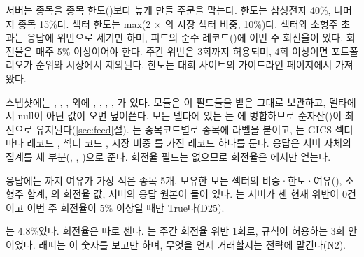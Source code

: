 \seclabel
{}

 서버는 종목을 종목 한도()보다 높게 만들 주문을 막는다. 한도는 삼성전자 40\%, 나머지 종목 15\%다. 섹터 한도는 max(2 $\times$ 의 시장 섹터 비중, 10\%)다. 섹터와 소형주 초과는  응답에 위반으로 세기만 하며, 피드의 준수 레코드()에 이번 주 회전율이 있다. 회전율은 매주 5\% 이상이어야 한다. 주간 위반은 3회까지 허용되며, 4회 이상이면 포트폴리오가 순위와 시상에서 제외된다. 한도는 대회 사이트의 가이드라인 페이지에서 가져왔다.

 스냅샷에는 , , ,  외에 , , , , 가 있다.  모듈은 이 필드들을 받은 그대로 보관하고, 델타에서 null이 아닌 값이 오면 덮어쓴다. 모든 델타에 있는 는 에 병합하므로 순자산()이 최신으로 유지된다(\ref{sec:feed}절). 는 종목코드별로 종목에 라벨을 붙이고, 는 GICS 섹터마다 레코드 , 섹터 코드 , 시장 비중 를 가진 레코드 하나를 둔다.  응답은 서버 자체의 집계를 세 부분(, , )으로 준다. 회전율 필드는 없으므로 회전율은 에서만 얻는다.



 응답에는 까지 여유가 가장 적은 종목 5개, 보유한 모든 섹터의 비중·한도·여유(), 소형주 합계, 의 회전율 값, 서버의  응답 원본이 들어 있다. 는 서버가 센 현재 위반이 0건이고 이번 주 회전율이 5\% 이상일 때만 True다(D25).



 는 4.8\%였다. 회전율은 따로 센다. 는 주간 회전율 위반 1회로, 규칙이 허용하는 3회 안이었다. 래퍼는 이 숫자를 보고만 하며, 무엇을 언제 거래할지는 전략에 맡긴다(N2).

